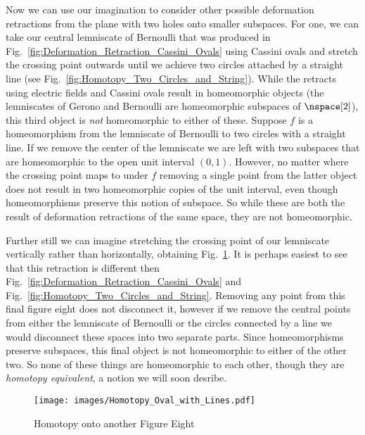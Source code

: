         Now we can use our imagination to consider other possible
        deformation retractions from the plane with two holes onto
        smaller subspaces. For one, we can take our central lemniscate
        of Bernoulli that was produced in
        Fig.~\ref{fig:Deformation_Retraction_Cassini_Ovals} using
        Cassini ovals and stretch the crossing point outwards until we
        achieve two circles attached by a straight line
        (see Fig.~\ref{fig:Homotopy_Two_Circles_and_String}). While the
        retracts using electric fields and Cassini ovals result in
        homeomorphic objects (the lemniscates of Gerono and  Bernoulli
        are homeomorphic subspaces of $\nspace[2]$), this third object
        is \textit{not} homeomorphic to either of these. Suppose $f$ is
        a homeomorphism from the lemniscate of Bernoulli to two circles
        with a straight line. If we remove the center of the lemniscate
        we are left with two subspaces that are homeomorphic to the open
        unit interval $(0,1)$. However, no matter where the crossing
        point maps to under $f$ removing a single point from the latter
        object does not result in two homeomorphic copies of the unit
        interval, even though homeomorphisms preserve this notion of
        subspace. So while these are both the result of deformation
        retractions of the same space, they are not homeomorphic.
        \par\hfill\par
        Further still we can imagine stretching the crossing point of
        our lemniscate vertically rather than horizontally, obtaining
        Fig.~\ref{fig:Homotopy_Oval_with_Line}. It is perhaps easiest to
        see that this retraction is different then
        Fig.~\ref{fig:Deformation_Retraction_Cassini_Ovals} and
        Fig.~\ref{fig:Homotopy_Two_Circles_and_String}. Removing
        any point from this final figure eight does not disconnect it,
        however if we remove the central points from either the
        lemniscate of Bernoulli or the circles connected by a line we
        would disconnect these spaces into two separate parts. Since
        homeomorphisms preserve subspaces, this final object is not
        homeomorphic to either of the other two. So none of these things
        are homeomorphic to each other, though they are
        \textit{homotopy equivalent}, a notion we will soon desribe.
        \begin{figure}[H]
            \centering
            \captionsetup{type=figure}
            \texttt{[image: images/Homotopy\_Oval\_with\_Lines.pdf]}
            \caption{Homotopy onto another Figure Eight}
            \label{fig:Homotopy_Oval_with_Line}
        \end{figure}
